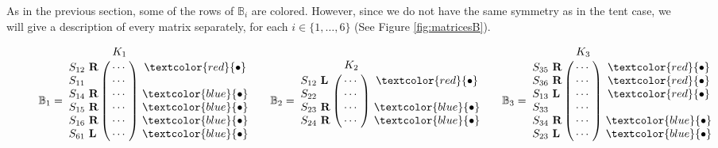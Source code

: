 \documentclass[12pt]{book}
\theoremstyle{plain}
\theoremstyle{remark}
\begin{document}
As in the previous section, some of the rows of $\mathbb B_i$ are colored. However, since we do not have the same symmetry as in the tent case, we will give a description of every matrix separately, for each $i \in \{1, \ldots, 6\}$ (See Figure \ref{fig:matricesB}). 

\begin{figure}
\centering
\[ \mathbb B_1 = \bordermatrix{ & K_1\cr
		S_{12}\ \textbf{R} &\cdots \cr
		         S_{11}\            & \cdots \cr
                S_{14}\ \textbf{R} & \cdots \cr
                S_{15}\ \textbf{R} & \cdots \cr
                S_{16}\ \textbf{R} & \cdots \cr
                S_{61}\ \textbf{L} & \cdots }\
                \begin{matrix}
                \textcolor{red}{\bullet} \\ \\ \textcolor{blue}{\bullet} \\ \textcolor{blue}{\bullet} \\ \textcolor{blue}{\bullet} \\ \textcolor{blue}{\bullet}
                \end{matrix} \qquad
   \mathbb B_2 = \bordermatrix{ & K_2\cr
		S_{12}\ \textbf{L} & \cdots \cr
                S_{22}\            & \cdots \cr
                S_{23}\ \textbf{R} & \cdots \cr
                S_{24}\ \textbf{R} &  \cdots }\
                \begin{matrix}
                \textcolor{red}{\bullet} \\ \\ \textcolor{blue}{\bullet} \\ \textcolor{blue}{\bullet} 
                \end{matrix} \qquad
   \mathbb B_3 = \bordermatrix{ & K_3\cr
                S_{35}\ \textbf{R} & \cdots \cr
                S_{36}\ \textbf{R} & \cdots \cr
                S_{13}\ \textbf{L} & \cdots \cr
                S_{33}\            & \cdots \cr
                S_{34}\ \textbf{R} & \cdots \cr
                S_{23}\ \textbf{L} & \cdots }\
                \begin{matrix}
                 \textcolor{red}{\bullet} \\ \textcolor{red}{\bullet} \\ \textcolor{red}{\bullet} \\ \\ \textcolor{blue}{\bullet} \\ \textcolor{blue}{\bullet}
                \end{matrix} \]
                

\end{figure}
\end{document}
